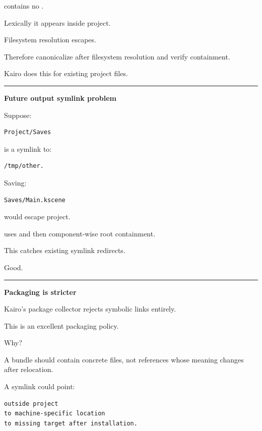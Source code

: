 contains no .

Lexically it appears inside project.

Filesystem resolution escapes.

Therefore canonicalize after filesystem resolution and verify containment.

Kairo does this for existing project files.

\begin{center}\rule{0.5\linewidth}{0.5pt}\end{center}

\textbf{Future output symlink problem}

Suppose:

\begin{verbatim}
Project/Saves
\end{verbatim}

is a symlink to:

\begin{verbatim}
/tmp/other.
\end{verbatim}

Saving:

\begin{verbatim}
Saves/Main.kscene
\end{verbatim}

would escape project.

 uses  and then component-wise root containment.

This catches existing symlink redirects.

Good.

\begin{center}\rule{0.5\linewidth}{0.5pt}\end{center}

\textbf{Packaging is stricter}

Kairo's package collector rejects symbolic links entirely.

This is an excellent packaging policy.

Why?

A bundle should contain concrete files, not references whose meaning changes after relocation.

A symlink could point:

\begin{verbatim}
outside project
to machine-specific location
to missing target after installation.
\end{verbatim}

